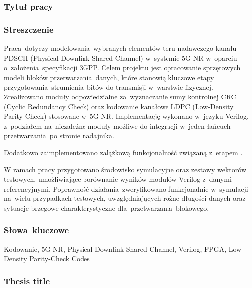 \subsubsection*{Tytuł pracy} 
\Title

\subsubsection*{Streszczenie}  
Praca~dotyczy modelowania~wybranych elementów toru nadawczego kanału PDSCH (Physical Downlink Shared Channel) w~systemie 5G NR w~oparciu o~założenia~specyfikacji 3GPP. Celem projektu jest opracowanie sprzętowych modeli bloków przetwarzania~danych, które stanowią kluczowe etapy przygotowania~strumienia~bitów do transmisji w~warstwie fizycznej. Zrealizowano moduły odpowiedzialne za~wyznaczanie sumy kontrolnej CRC (Cyclic Redundancy Check) oraz kodowanie kanałowe LDPC (Low-Density Parity-Check) stosowane w~5G NR. Implementację wykonano w~języku Verilog, z~podziałem na~niezależne moduły możliwe do integracji w~jeden łańcuch przetwarzania~po stronie nadajnika.

Dodatkowo zaimplementowano zalążkową funkcjonalność związaną z~etapem .

W ramach pracy przygotowano środowisko symulacyjne oraz zestawy wektorów testowych, umożliwiające porównanie wyników modułów Verilog z~danymi referencyjnymi. Poprawność działania~zweryfikowano funkcjonalnie w~symulacji na~wielu przypadkach testowych, uwzględniających różne długości danych oraz sytuacje brzegowe charakterystyczne dla~przetwarzania~blokowego.

\subsubsection*{Słowa~kluczowe} 
Kodowanie, 5G NR, Physical Downlink Shared Channel, Verilog, FPGA, Low-Density Parity-Check Codes

\subsubsection*{Thesis title} 
\begin{otherlanguage}{british}
\TitleAlt
\end{otherlanguage}

